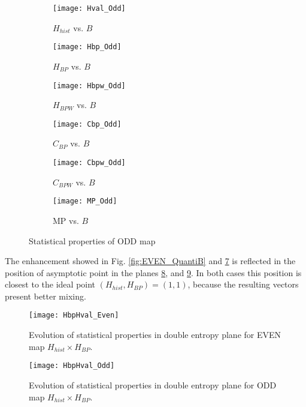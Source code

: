 \begin{figure}[htpb]
	\centering
	\begin{subfigure}[b]{0.49\textwidth}
		\texttt{[image: Hval\_Odd]}
		\caption{$H_{hist}$ vs. $B$}
		\label{fig:Hval_Odd}
	\end{subfigure}
	\begin{subfigure}[b]{0.49\textwidth}
		\texttt{[image: Hbp\_Odd]}
		\caption{$H_{BP}$ vs. $B$}
		\label{fig:Hbp_Odd}
	\end{subfigure}
	\begin{subfigure}[b]{0.49\textwidth}
		\texttt{[image: Hbpw\_Odd]}
		\caption{$H_{BPW}$ vs. $B$}
		\label{fig:Hbpw_Odd}
	\end{subfigure}
	\begin{subfigure}[b]{0.49\textwidth}
		\texttt{[image: Cbp\_Odd]}
		\caption{$C_{BP}$ vs. $B$}
		\label{fig:Cbp_Odd}
	\end{subfigure}
	\begin{subfigure}[b]{0.49\textwidth}
		\texttt{[image: Cbpw\_Odd]}
		\caption{$C_{BPW}$ vs. $B$}
		\label{fig:Cbpw_Odd}
	\end{subfigure}
	\begin{subfigure}[b]{0.49\textwidth}
		\texttt{[image: MP\_Odd]}
		\caption{MP vs. $B$}
		\label{fig:MP_Odd}
	\end{subfigure}
	\caption{Statistical properties of ODD map}
	\label{fig:ODD_QuantiB}
\end{figure}

The enhancement showed in Fig. \ref{fig:EVEN_QuantiB} and \ref{fig:ODD_QuantiB} is reflected in the position of asymptotic point in the planes \ref{fig:EVEN_HH}, and \ref{fig:ODD_HH}.
In both cases this position is closest to the ideal point $(H_{hist}, H_{BP})=(1, 1)$, because the resulting vectors present better mixing.

\begin{figure}[htpb]
	\centering
	\texttt{[image: HbpHval\_Even]}
	\caption{Evolution of statistical properties in double entropy plane for EVEN map $H_{hist} \times H_{BP}$.}
	\label{fig:EVEN_HH}
\end{figure}

\begin{figure}[htpb]
	\centering
	\texttt{[image: HbpHval\_Odd]}
	\caption{Evolution of statistical properties in double entropy plane for ODD map $H_{hist} \times H_{BP}$.}
	\label{fig:ODD_HH}
\end{figure}

